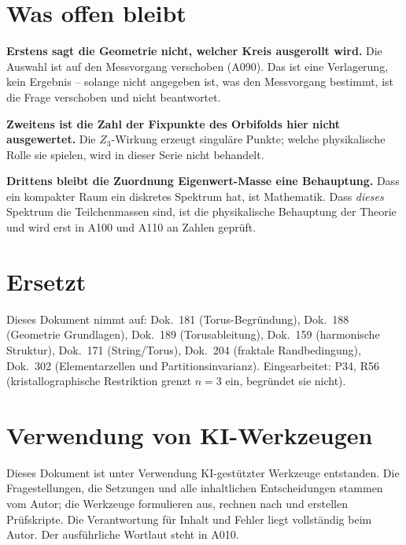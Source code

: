 \section{Was offen bleibt}

\textbf{Erstens sagt die Geometrie nicht, welcher Kreis ausgerollt wird.} Die
Auswahl ist auf den Messvorgang verschoben (A090). Das ist eine Verlagerung, kein
Ergebnis -- solange nicht angegeben ist, was den Messvorgang bestimmt, ist die
Frage verschoben und nicht beantwortet.

\textbf{Zweitens ist die Zahl der Fixpunkte des Orbifolds hier nicht
ausgewertet.} Die $Z_3$-Wirkung erzeugt singuläre Punkte; welche physikalische
Rolle sie spielen, wird in dieser Serie nicht behandelt.

\textbf{Drittens bleibt die Zuordnung Eigenwert-Masse eine Behauptung.} Dass ein
kompakter Raum ein diskretes Spektrum hat, ist Mathematik. Dass \emph{dieses}
Spektrum die Teilchenmassen sind, ist die physikalische Behauptung der Theorie
und wird erst in A100 und A110 an Zahlen geprüft.

\section{Ersetzt}

Dieses Dokument nimmt auf: Dok.~181 (Torus-Begründung), Dok.~188 (Geometrie
Grundlagen), Dok.~189 (Torusableitung), Dok.~159 (harmonische Struktur),
Dok.~171 (String/Torus), Dok.~204 (fraktale Randbedingung), Dok.~302
(Elementarzellen und Partitionsinvarianz). Eingearbeitet: P34, R56
(kristallographische Restriktion grenzt $n=3$ ein, begründet sie nicht).

\section{Verwendung von KI-Werkzeugen}

Dieses Dokument ist unter Verwendung KI-gestützter Werkzeuge entstanden. Die
Fragestellungen, die Setzungen und alle inhaltlichen Entscheidungen stammen vom
Autor; die Werkzeuge formulieren aus, rechnen nach und erstellen Prüfskripte.
Die Verantwortung für Inhalt und Fehler liegt vollständig beim Autor. Der
ausführliche Wortlaut steht in A010.
